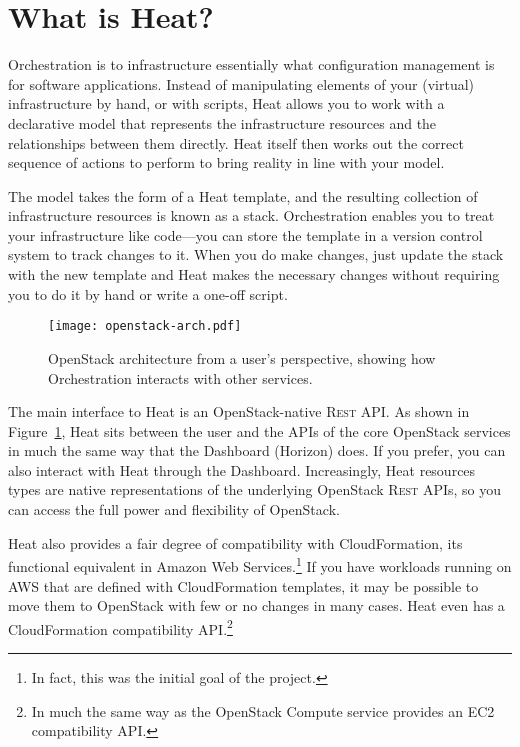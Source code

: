 \section{What is Heat?}

Orchestration is to infrastructure essentially what configuration management is for software applications. Instead of manipulating elements of your (virtual) infrastructure by hand, or with scripts, Heat allows you to work with a declarative model that represents the infrastructure resources and the relationships between them directly. Heat itself then works out the correct sequence of actions to perform to bring reality in line with your model.

The model takes the form of a Heat template, and the resulting collection of infrastructure resources is known as a stack. Orchestration enables you to treat your infrastructure like code---you can store the template in a version control system to track changes to it. When you do make changes, just update the stack with the new template and Heat makes the necessary changes without requiring you to do it by hand or write a one-off script.

\begin{figure}[b!]
\centering
\texttt{[image: openstack-arch.pdf]}
\caption{OpenStack architecture from a user's perspective, showing how Orchestration interacts with other services.}
\label{fig:openstack-arch}
\end{figure}

The main interface to Heat is an OpenStack-native \textsc{Rest} API. As shown in Figure~\ref{fig:openstack-arch}, Heat sits between the user and the APIs of the core OpenStack services in much the same way that the Dashboard (Horizon) does. If you prefer, you can also interact with Heat through the Dashboard. Increasingly, Heat resources types are native representations of the underlying OpenStack \textsc{Rest} APIs, so you can access the full power and flexibility of OpenStack.

Heat also provides a fair degree of compatibility with CloudFormation, its functional equivalent in Amazon Web Services.\footnote{In fact, this was the initial goal of the project.} If you have workloads running on AWS that are defined with CloudFormation templates, it may be possible to move them to OpenStack with few or no changes in many cases. Heat even has a CloudFormation compatibility API.\footnote{In much the same way as the OpenStack Compute service provides an EC2 compatibility API.}
